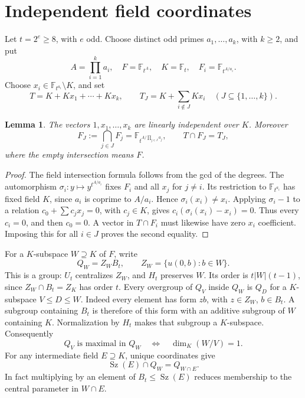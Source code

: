 \documentclass[11pt,a4paper]{article}
\newtheorem{lemma}{Lemma}\newtheorem{theorem}[lemma]{Theorem}
\newcommand{\Sz}{\operatorname{Sz}}\newcommand{\F}{\mathbb F}
\begin{document}
\section{Independent field coordinates}
Let $t=2^e\ge8$, with $e$ odd. Choose distinct odd primes
$a_1,\ldots,a_k$, with $k\ge2$, and put
\[
 A=\prod_{i=1}^k a_i,\quad F=\F_{t^A},\quad K=\F_t,
 \quad F_i=\F_{t^{A/a_i}}.
\]
Choose $x_i\in\F_{t^{a_i}}\setminus K$, and set
\[
 T=K+Kx_1+\cdots+Kx_k,\qquad
 T_J=K+\sum_{i\notin J}Kx_i\quad(J\subseteq\{1,\ldots,k\}).
\]
\begin{lemma}\label{field}
The vectors $1,x_1,\ldots,x_k$ are linearly independent over $K$.
Moreover
\[
 F_J:=\bigcap_{j\in J}F_j=\F_{t^{A/\prod_{j\in J}a_j}},
 \qquad T\cap F_J=T_J,
\]
where the empty intersection means $F$.
\end{lemma}
\begin{proof}
The field intersection formula follows from the gcd of the degrees.
The automorphism $\sigma_i:y\mapsto y^{t^{A/a_i}}$ fixes $F_i$ and
all $x_j$ for $j\ne i$. Its restriction to $\F_{t^{a_i}}$ has fixed
field $K$, since $a_i$ is coprime to $A/a_i$. Hence
$\sigma_i(x_i)\ne x_i$. Applying $\sigma_i-1$ to a relation
$c_0+\sum c_jx_j=0$, with $c_j\in K$, gives
$c_i(\sigma_i(x_i)-x_i)=0$. Thus every $c_i=0$, and then $c_0=0$.
A vector in $T\cap F_i$ must likewise have zero $x_i$ coefficient.
Imposing this for all $i\in J$ proves the second equality.
\end{proof}

For a $K$-subspace $W\supseteq K$ of $F$, write
\[
 Q_W=Z_WB_t,\qquad Z_W=\{u(0,b):b\in W\}.
\]
This is a group: $U_t$ centralizes $Z_W$, and $H_t$ preserves $W$.
Its order is $t|W|(t-1)$, since $Z_W\cap B_t=Z_K$ has order $t$.
Every overgroup of $Q_V$ inside $Q_W$ is $Q_D$ for a $K$-subspace
$V\le D\le W$. Indeed every element has form $zb$, with
$z\in Z_W$, $b\in B_t$. A subgroup containing $B_t$ is therefore
of this form with an additive subgroup of $W$ containing $K$.
Normalization by $H_t$ makes that subgroup a $K$-subspace. Consequently
\[
 Q_V\text{ is maximal in }Q_W\quad\Longleftrightarrow\quad
 \dim_K(W/V)=1.                                      \tag{1}
\]
For any intermediate field $E\supseteq K$, unique coordinates give
\[
 \Sz(E)\cap Q_W=Q_{W\cap E}.                         \tag{2}
\]
In fact multiplying by an element of $B_t\le\Sz(E)$ reduces
membership to the central parameter in $W\cap E$.
\end{document}
